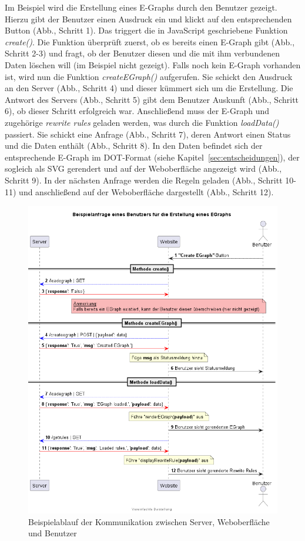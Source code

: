 Im Beispiel wird die Erstellung eines E-Graphs durch den Benutzer gezeigt. Hierzu gibt der Benutzer einen Ausdruck ein und klickt auf den entsprechenden Button (Abb., Schritt 1).
Das triggert die in JavaScript geschriebene Funktion \textit{create()}. Die Funktion überprüft zuerst, ob es bereits einen E-Graph gibt (Abb., Schritt 2-3) und fragt, ob der Benutzer
diesen und die mit ihm verbundenen Daten löschen will (im Beispiel nicht gezeigt). Falls noch kein E-Graph vorhanden ist, wird nun die Funktion \textit{createEGraph()}
aufgerufen. Sie schickt den Ausdruck an den Server (Abb., Schritt 4) und dieser kümmert sich um die Erstellung. Die Antwort des Servers (Abb., Schritt 5) gibt dem Benutzer 
Auskunft (Abb., Schritt 6), ob dieser Schritt erfolgreich war. 
Anschließend muss der E-Graph und zugehörige \textit{rewrite rules} geladen werden, was durch die Funktion \textit{loadData()} passiert.
Sie schickt eine Anfrage (Abb., Schritt 7), deren Antwort einen Status und die Daten enthält (Abb., Schritt 8). In den Daten befindet sich der entsprechende E-Graph im 
DOT-Format (siehe Kapitel~\ref{sec:entscheidungen}), der sogleich als SVG gerendert und auf der Weboberfläche angezeigt wird (Abb., Schritt 9).
In der nächsten Anfrage werden die Regeln geladen (Abb., Schritt 10-11) und anschließend auf der Weboberfläche dargestellt (Abb., Schritt 12).

\begin{figure}[H]
  \centering
  \includegraphics[scale=0.6]{../fig/query.png}
  \caption{Beispielablauf der Kommunikation zwischen Server, Weboberfläche und Benutzer}
  \label{fig:ablauf}
\end{figure}
